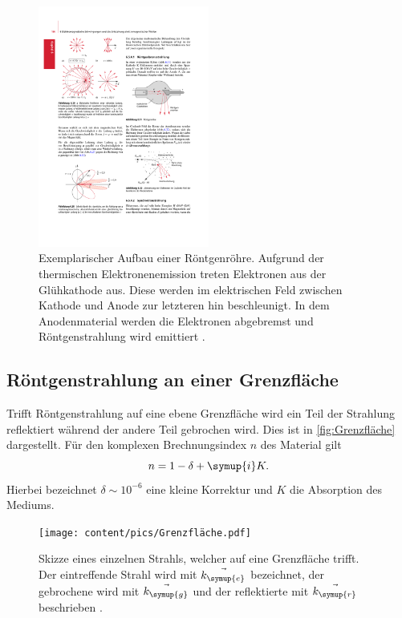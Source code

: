 \begin{figure}
    \centering
    \includegraphics[width=0.5\textwidth]{content/pics/Röntgenröhre.pdf}
    \caption{Exemplarischer Aufbau einer Röntgenröhre. Aufgrund der thermischen Elektronenemission treten Elektronen aus der Glühkathode aus. %
    Diese werden im elektrischen Feld zwischen Kathode und Anode zur letzteren hin beschleunigt. In dem Anodenmaterial werden die Elektronen abgebremst und %
    Röntgenstrahlung wird emittiert \cite{Demtröder2}.}
    \label{fig:Röntgenröhre}
\end{figure}


\subsection{Röntgenstrahlung an einer Grenzfläche}
Trifft Röntgenstrahlung auf eine ebene Grenzfläche wird ein Teil der Strahlung reflektiert während der andere Teil gebrochen wird. Dies ist in \autoref{fig:Grenzfläche}
dargestellt. 
Für den komplexen Brechnungsindex $n$ des Material gilt
\begin{equation*}
    n = 1 - \delta + \symup{i} K.
\end{equation*}
Hierbei bezeichnet $\delta \sim 10^{-6}$ eine kleine Korrektur und $K$ die Absorption des Mediums.
\begin{figure}
    \centering
    \texttt{[image: content/pics/Grenzfläche.pdf]}
    \caption{Skizze eines einzelnen Strahls, welcher auf eine Grenzfläche trifft. Der eintreffende Strahl wird mit $\vec{k_{\symup{e}}}$ bezeichnet, der gebrochene %
    wird mit $\vec{k_{\symup{g}}}$ und der reflektierte mit $\vec{k_{\symup{r}}}$ beschrieben \cite{Demtröder2}.}
    \label{fig:Grenzfläche}
\end{figure}


